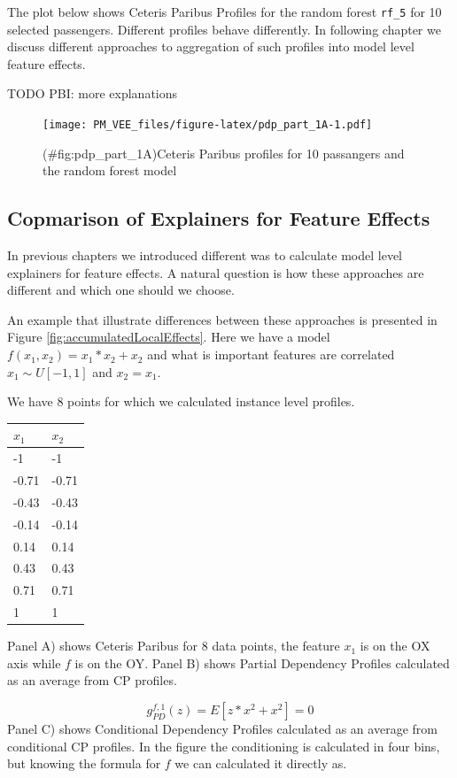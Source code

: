 \documentclass[12pt,]{krantz}
\begin{document}
The plot below shows Ceteris Paribus Profiles for the random forest \texttt{rf\_5} for 10 selected passengers.
Different profiles behave differently. In following chapter we discuss different approaches to aggregation of such profiles into model level feature effects.

TODO PBI: more explanations

\begin{figure}
\centering
\texttt{[image: PM\_VEE\_files/figure-latex/pdp\_part\_1A-1.pdf]}
\caption{(\#fig:pdp\_part\_1A)Ceteris Paribus profiles for 10 passangers and the random forest model}
\end{figure}

\hypertarget{summaryFeatureEffects}{%
\subsection{Copmarison of Explainers for Feature Effects}\label{summaryFeatureEffects}}

In previous chapters we introduced different was to calculate model level explainers for feature effects.
A natural question is how these approaches are different and which one should we choose.

An example that illustrate differences between these approaches is presented in Figure \ref{fig:accumulatedLocalEffects}.
Here we have a model \(f(x_1, x_2) = x_1*x_2 + x_2\) and what is important features are correlated \(x_1 \sim U[-1,1]\) and \(x_2 = x_1\).

We have 8 points for which we calculated instance level profiles.

\begin{longtable}[]{@{}ll@{}}
\toprule
\(x_1\) & \(x_2\)\tabularnewline
\midrule
\endhead
-1 & -1\tabularnewline
-0.71 & -0.71\tabularnewline
-0.43 & -0.43\tabularnewline
-0.14 & -0.14\tabularnewline
0.14 & 0.14\tabularnewline
0.43 & 0.43\tabularnewline
0.71 & 0.71\tabularnewline
1 & 1\tabularnewline
\bottomrule
\end{longtable}

Panel A) shows Ceteris Paribus for 8 data points, the feature \(x_1\) is on the OX axis while \(f\) is on the OY.
Panel B) shows Partial Dependency Profiles calculated as an average from CP profiles.

\[
g_{PD}^{f,1}(z) = E[z*x^2 + x^2] = 0
\]
Panel C) shows Conditional Dependency Profiles calculated as an average from conditional CP profiles. In the figure the conditioning is calculated in four bins, but knowing the formula for \(f\) we can calculated it directly as.
\end{document}
